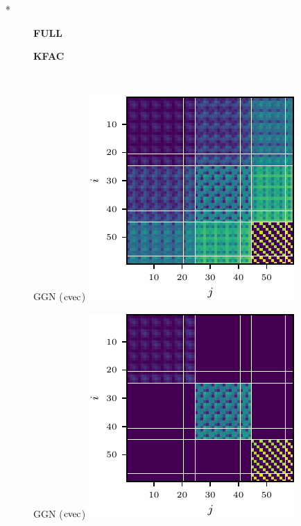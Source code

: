 \switchcolumn[1]*
\begin{figure}[t!]
  \centering
  \begin{minipage}[t]{0.485\linewidth}
    \centering
    \textbf{FULL}
  \end{minipage}
  \hfill
  \begin{minipage}[t]{0.485\linewidth}
    \centering
    \textbf{KFAC}
  \end{minipage}
  \\
  \begin{minipage}[t]{0.485\linewidth}
    \centering
    GGN ($\operatorname{cvec}$)\vspace{1ex}
    \includegraphics[width=0.8\linewidth]{../kfs/plots/synthetic_cvec_ggn_full.pdf}
  \end{minipage}
  \hfill
  \begin{minipage}[t]{0.485\linewidth}
    \centering
    GGN ($\operatorname{cvec}$)\vspace{1ex}
    \includegraphics[width=0.8\linewidth]{../kfs/plots/synthetic_cvec_ggn_kfac.pdf}

\end{minipage}
\end{figure}
